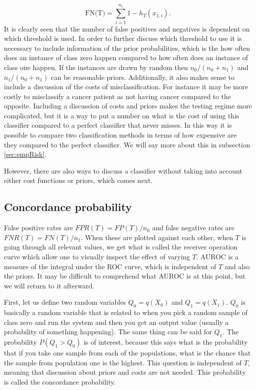 \documentclass{article}
\theoremstyle{theorem}
\theoremstyle{definition}
\begin{document}
\begin{equation}
\label{eq:fp}
\mbox{FN(T)} = \sum_{i= 1}^{n_1} 1 - h_T(x_{1,i}).
\end{equation}
It is clearly seen that the number of false positives and negatives is dependent on which threshold is used.  In order to further discuss which threshold to use it is necessary to include information of the prior probabilities, which is the how often does an instance of class zero happen compared to how often does an instance of class one happen.  If the instances are drawn by random then $n_0/(n_0 + n_1)$ and $n_1/(n_0 + n_1)$ can be reasonable priors.  Additionally, it also makes sense to include a discussion of the costs of misclassification.  For instance it may be more costly to misclassify a cancer patient as not having cancer compared to the opposite.  Including a discussion of costs and priors makes the testing regime more complicated, but it is a way to put a number on what is the cost of using this classifier compared to a perfect classifier that never misses. In this way it is possible to compare two classification methods in terms of how expensive are they compared to the perfect classifier.  We will say more about this in subsection \ref{sec:empRisk}.

However, there are also ways to discuss a classifier without taking into account either cost functions or priors, which comes next.

\subsection{Concordance probability}
\label{sec:conProb}


False positive rates are $FPR(T) = FP(T) / n_0$ and false negative rates are $FNR(T) = FN(T) / n_1$.  When these are plotted against each other, when $T$ is going through all relevant values, we get what is called the receiver operation curve which allow one to visually inspect the effect of varying $T$.  AUROC is a measure of the integral under the ROC curve, which is independent of $T$ and also the priors.  It may be difficult to comprehend what AUROC is at this point, but we will return to it afterward.

First, let us define two random variables $Q_0 = q(X_0)$ and $Q_1 = q(X_1)$.  $Q_0$ is basically a random variable that is related to when you pick a random sample of class zero and run the system and then you get an output value (usually a probability of something happening).  The same thing can be said for $Q_1$.  The probability $P(Q_1 > Q_0)$ is of interest, because this says what is the probability that if you take one sample from each of the populations, what is the chance that the sample from population one is the highest.  This question is independent of $T$, meaning that discussion about priors and costs are not needed. This probability is called the concordance probability.
\end{document}
